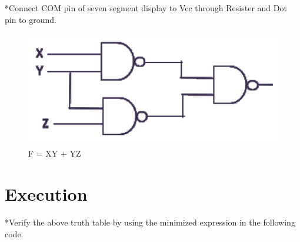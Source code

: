 \documentclass[10pt, a4paper]{article}
\begin{document}
*Connect COM pin of seven segment display to Vcc through Resister and Dot pin to ground.

\begin{figure}
    \centering
    \includegraphics{a1.png}
    \caption{F = XY + YZ}
    \label{fig:my_label}
\end{figure}
\section{Execution}
*Verify the above truth table by using the minimized expression in the following code.


\end{document}
